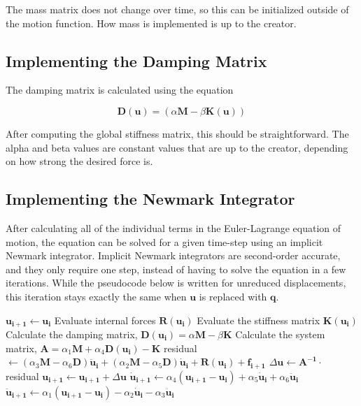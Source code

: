 \documentclass[twocolumn,10pt]{asme2ej}
\begin{document}
The mass matrix does not change over time, so this can be initialized outside of the motion function. How mass is implemented is up to the creator.

\subsection{Implementing the Damping Matrix}

The damping matrix is calculated using the equation

\begin{equation}
\bm{D}(\bm{u}) = \left(\alpha \bm{M} - \beta \bm{K}(\bm{u})\right)
\label{eq_damp}
\end{equation}

After computing the global stiffness matrix, this should be straightforward. The alpha and beta values are constant values that are up to the creator, depending on how strong the desired force is.

\subsection{Implementing the Newmark Integrator}

After calculating all of the individual terms in the Euler-Lagrange equation of motion, the equation can be solved for a given time-step using an implicit Newmark integrator. Implicit Newmark integrators are second-order accurate, and they only require one step, instead of having to solve the equation in a few iterations. While the pseudocode below is written for unreduced displacements, this iteration stays exactly the same when $\bm{u}$ is replaced with $\bm{q}$.

\bigskip
\begin{algorithmic}[1]
      \State $\bm{u_{i + 1}} \gets \bm{u_i}$
      \State Evaluate internal forces $\bm{R}(\bm{u_i})$
      \State Evaluate the stiffness matrix $\bm{K}(\bm{u_i})$
      \State Calculate the damping matrix, $\bm{D}(\bm{u_i}) = \alpha \bm{M} - \beta \bm{K}$
      \State Calculate the system matrix, $\bm{A} = \alpha_1\bm{M} + \alpha_4\bm{D}(\bm{u_i}) - \bm{K}$
      \State residual $\gets (\alpha_3\bm{M} - \alpha_6\bm{D}) \bm{ \ddot u_i} + (\alpha_2\bm{M} - \alpha_5\bm{D}) \bm{ \dot u_{i}} + \bm{R}(\bm{u_i}) + \bm{f_{i+1}}$
      \State $ \Delta \bm{u} \gets \bm{A^{-1}} \cdot $ residual
      \State $ \bm{u_{i + 1}} \gets \bm{u_{i + 1}} + \Delta \bm{u}$
      \State $ \bm{ \dot u_{i + 1}} \gets \alpha_4(\bm{u_{i+1}} - \bm{u_i}) + \alpha_5 \bm{ \dot u_i} + \alpha_6 \bm{ \ddot u_i}$
      \State $ \bm{ \ddot u_{i + 1}} \gets \alpha_1(\bm{u_{i+1}} - \bm{u_i}) - \alpha_2 \bm{\dot u_i} - \alpha_3 \bm{\ddot u_i}$
    \EndFunction
\end{algorithmic}
\end{document}
